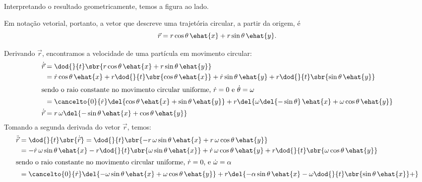 \documentclass[]{IMTexam}
\begin{document}
\begin{questions}
\begin{solution}
\begin{multi}
		\end{multi}

		Interpretando o resultado geometricamente, temos a figura ao lado.

		Em notação vetorial, portanto, a vetor que descreve uma trajetória circular, a partir da origem, é
		\begin{equation}\label{eq:rvec}
			\vec{r}=r\cos\theta\, \ehat{x}+r\sin\theta\, \ehat{y}.
		\end{equation}

		Derivando $ \vec{r} $, encontramos a velocidade de uma partícula em movimento circular:
		\begin{align*}
			\dot{\vec{r}} & =\dod{}{t}\sbr{r\cos\theta\, \ehat{x}+r\sin\theta\, \ehat{y}}                                                                                 \\
			              & =\dot{r}\cos\theta\, \ehat{x}+r\dod{}{t}\sbr{\cos\theta\, \ehat{x}}+\dot{r}\sin\theta\, \ehat{y}+r\dod{}{t}\sbr{\sin\theta\, \ehat{y}}        \\
			\intertext{sendo o raio constante no movimento circular uniforme, $ \dot{r}=0 $ e $ \dot{\theta}=\omega $}
			              & =\cancelto{0}{\dot{r}}\del{\cos\theta\, \ehat{x}+\sin\theta\, \ehat{y}}+r\del{\omega\del{-\sin\theta}\, \ehat{x}+\omega\cos\theta\, \ehat{y}} \\
			\dot{\vec{r}} & =r\,\omega\del{-\sin\theta\, \ehat{x}+\cos\theta\, \ehat{y}}
		\end{align*}
		Tomando a segunda derivada do vetor $ \vec{r} $, temos:
		\begin{align*}
			\ddot{\vec{r}} & =\dod{}{t}\sbr{\dot{\vec{r}}}=\dod{}{t}\sbr{-r\,\omega\sin\theta\, \ehat{x}+r\,\omega\cos\theta\, \ehat{y}}                                                                  \\
			               & =-\dot{r}\,\omega\sin\theta\, \ehat{x}-r\dod{}{t}\sbr{\omega\sin\theta\, \ehat{x}}+\dot{r}\,\omega\cos\theta\, \ehat{y}+r\dod{}{t}\sbr{\omega\cos\theta\, \ehat{y}}          \\
			\intertext{sendo o raio constante no movimento circular uniforme, $ \dot{r}=0 $, e $ \dot{\omega}=\alpha $}
			               & =\cancelto{0}{\dot{r}}\del{-\omega\sin\theta\, \ehat{x}+\omega\cos\theta\, \ehat{y}}
			+r\del{-\alpha\sin\theta\, \ehat{x}-\omega\dod{}{t}\sbr{\sin\theta\, \ehat{x}}+
}
\end{align*}
\end{solution}
\end{questions}
\end{document}
